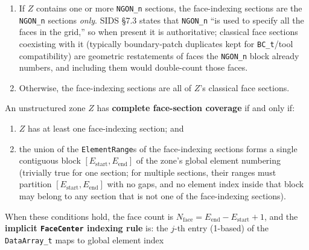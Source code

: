 \documentclass[11pt,letterpaper]{article}
\begin{document}
\begin{enumerate}[leftmargin=2em]
\item[T1.] If $Z$ contains one or more \texttt{NGON\_n} sections, the
  face-indexing sections are the \texttt{NGON\_n} sections \emph{only}.
  SIDS \S7.3 states that \texttt{NGON\_n} ``is used to specify all the
  faces in the grid,'' so when present it is authoritative; classical
  face sections coexisting with it (typically boundary-patch duplicates
  kept for \texttt{BC\_t}/tool compatibility) are geometric restatements
  of faces the \texttt{NGON\_n} block already numbers, and including
  them would double-count those faces.
\item[T2.] Otherwise, the face-indexing sections are all of $Z$'s
  classical face sections.
\end{enumerate}

An unstructured zone $Z$ has \textbf{complete face-section coverage} if
and only if:

\begin{enumerate}[leftmargin=2em]
\item $Z$ has at least one face-indexing section; and
\item the union of the \texttt{ElementRange}s of the face-indexing
  sections forms a single contiguous block
  $[E_{\mathrm{start}}, E_{\mathrm{end}}]$ of the zone's global element
  numbering (trivially true for one section; for multiple sections,
  their ranges must partition $[E_{\mathrm{start}}, E_{\mathrm{end}}]$
  with no gaps, and no element index inside that block may belong to
  any section that is not one of the face-indexing sections).
\end{enumerate}

When these conditions hold, the face count is
$N_{\mathrm{face}} = E_{\mathrm{end}} - E_{\mathrm{start}} + 1$, and the
\textbf{implicit \texttt{FaceCenter} indexing rule} is: the $j$-th entry
(1-based) of the \texttt{DataArray\_t} maps to global element index
\end{document}

